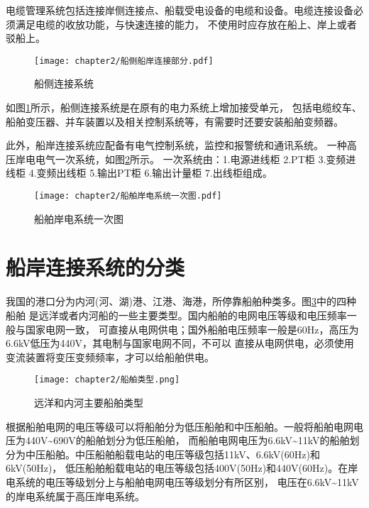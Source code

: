 电缆管理系统包括连接岸侧连接点、船载受电设备的电缆和设备。电缆连接设备必须满足电缆的收放功能，与快速连接的能力，
不使用时应存放在船上、岸上或者驳船上。

\begin{figure}[!htp]
	\centering
	\texttt{[image: chapter2/船侧船岸连接部分.pdf]}
	\caption{船侧连接系统}
	\label{fig:船侧连接系统}
\end{figure}

如图\ref{fig:船侧连接系统}所示，船侧连接系统是在原有的电力系统上增加接受单元，
包括电缆绞车、船舶变压器、并车装置以及相关控制系统等，有需要时还要安装船舶变频器\cite{SP15}。

此外，船岸连接系统应配备有电气控制系统，监控和报警统和通讯系统。
一种高压岸电电气一次系统，如图\ref{fig:船舶岸电系统一次图}所示。
一次系统由：1.电源进线柜 2.PT柜 3.变频进线柜 4.变频出线柜 5.输出PT柜 6.输出计量柜 7.出线柜组成。

\begin{figure}[!htp]
	\centering
	\texttt{[image: chapter2/船舶岸电系统一次图.pdf]}
	\caption{船舶岸电系统一次图}
	\label{fig:船舶岸电系统一次图}
\end{figure}

\section{船岸连接系统的分类}

我国的港口分为内河(河、湖)港、江港、海港，所停靠船舶种类多。图\ref{fig:远洋和内河主要船舶类型}中的四种船舶
是远洋或者内河船的一些主要类型。国内船舶的电网电压等级和电压频率一般与国家电网一致，
可直接从电网供电\cite{SP16}；国外船舶电压频率一般是60Hz，高压为6.6kV低压为440V，其电制与国家电网不同，不可以
直接从电网供电，必须使用变流装置将变压变频频率，才可以给船舶供电。

\begin{figure}[!htp]
	\centering
	\texttt{[image: chapter2/船舶类型.png]}
	\caption{远洋和内河主要船舶类型}
	\label{fig:远洋和内河主要船舶类型}
\end{figure}

根据船舶电网的电压等级可以将船舶分为低压船舶和中压船舶。一般将船舶电网电压为440V\~{}690V的船舶划分为低压船舶，
而船舶电网电压为6.6kV\~{}11kV的船舶划分为中压船舶。中压船舶船载电站的电压等级包括11kV、6.6kV(60Hz)和6kV(50Hz)，
低压船舶船载电站的电压等级包括400V(50Hz)和440V(60Hz)\cite{SP15}。在岸电系统的电压等级划分上与船舶电网电压等级划分有所区别，
电压在6.6kV\~{}11kV的岸电系统属于高压岸电系统。

